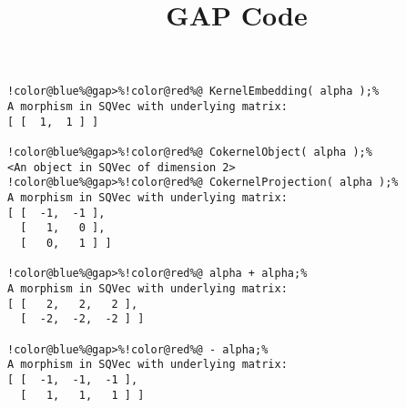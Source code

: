 \documentclass[12pt]{amsart}
\title{GAP Code}
\author{}
\begin{document}
\maketitle

\begin{Verbatim}[commandchars=!@\%,frame=single]
!color@blue%@gap>%!color@red%@ KernelEmbedding( alpha );%
A morphism in SQVec with underlying matrix:
[ [  1,  1 ] ]

!color@blue%@gap>%!color@red%@ CokernelObject( alpha );%
<An object in SQVec of dimension 2>
!color@blue%@gap>%!color@red%@ CokernelProjection( alpha );%
A morphism in SQVec with underlying matrix:
[ [  -1,  -1 ],
  [   1,   0 ],
  [   0,   1 ] ]

!color@blue%@gap>%!color@red%@ alpha + alpha;%
A morphism in SQVec with underlying matrix:
[ [   2,   2,   2 ],
  [  -2,  -2,  -2 ] ]

!color@blue%@gap>%!color@red%@ - alpha;%
A morphism in SQVec with underlying matrix:
[ [  -1,  -1,  -1 ],
  [   1,   1,   1 ] ]

\end{Verbatim}
\end{document}
